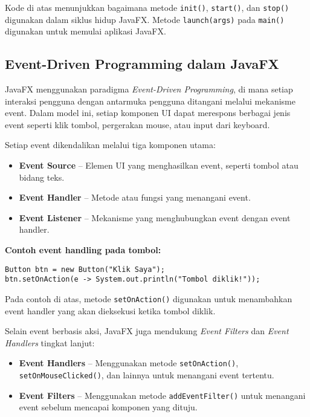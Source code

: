 Kode di atas menunjukkan bagaimana metode \texttt{init()}, \texttt{start()}, dan \texttt{stop()} digunakan dalam siklus hidup JavaFX. Metode \texttt{launch(args)} pada \texttt{main()} digunakan untuk memulai aplikasi JavaFX.

\subsection{Event-Driven Programming dalam JavaFX}

JavaFX menggunakan paradigma \textit{Event-Driven Programming}, di mana setiap interaksi pengguna dengan antarmuka pengguna ditangani melalui mekanisme event. Dalam model ini, setiap komponen UI dapat merespons berbagai jenis event seperti klik tombol, pergerakan mouse, atau input dari keyboard.

Setiap event dikendalikan melalui tiga komponen utama:
\begin{itemize}
\item \textbf{Event Source} – Elemen UI yang menghasilkan event, seperti tombol atau bidang teks.
\item \textbf{Event Handler} – Metode atau fungsi yang menangani event.
\item \textbf{Event Listener} – Mekanisme yang menghubungkan event dengan event handler.
\end{itemize}

\textbf{Contoh event handling pada tombol:}
\begin{lstlisting}[style=JavaStyle, caption=Menangani event klik tombol di JavaFX]
Button btn = new Button("Klik Saya");
btn.setOnAction(e -> System.out.println("Tombol diklik!"));
\end{lstlisting}

Pada contoh di atas, metode \texttt{setOnAction()} digunakan untuk menambahkan event handler yang akan dieksekusi ketika tombol diklik.

Selain event berbasis aksi, JavaFX juga mendukung \textit{Event Filters} dan \textit{Event Handlers} tingkat lanjut:
\begin{itemize}
\item \textbf{Event Handlers} – Menggunakan metode \texttt{setOnAction()}, \texttt{setOnMouseClicked()}, dan lainnya untuk menangani event tertentu.
\item \textbf{Event Filters} – Menggunakan metode \texttt{addEventFilter()} untuk menangani event sebelum mencapai komponen yang dituju.
\end{itemize}

